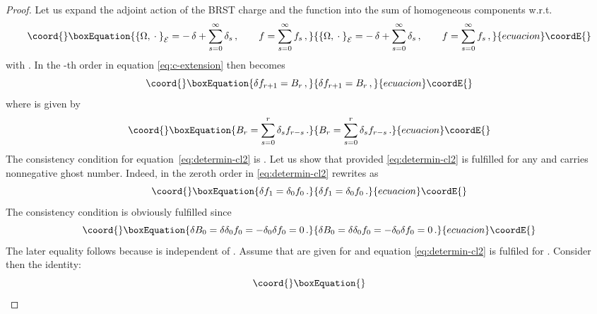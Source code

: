 \documentclass[a4paper,11pt]{amsart}
\numberwithin{thm}{section} %
\numberwithin{equation}{section} %
\numberwithin{figure}{section} %
\providecommand{\pb}[2]{\left\{{}#1{},{}#2{}\right\}}
\renewcommand{\:}{{\rm\, :\,}}
\def\d{\partial}
\providecommand{\dl}[1]{\displaystyle\frac{{\d}}{\d #1}}
\def\cc{{\mathcal C}}
\def\E{{ \mathcal E}}
\begin{document}
\begin{proof}
Let us expand the adjoint action \myHighlight{$\pb{\Omega}{\cdot}_\E$}\coordHE{} of the BRST
charge and the function \coordHE{} into the sum of homogeneous components
w.r.t. \coordHE{}
\begin{equation}\coord{}\boxEquation{
\pb{\Omega}{\cdot}_\E=-\,\delta+\sum_{s=0}^\infty \delta_s\,, \qquad
f=\sum_{s=0}^\infty f_s\,,
}{
\pb{\Omega}{\cdot}_\E=-\,\delta+\sum_{s=0}^\infty \delta_s\,, \qquad
f=\sum_{s=0}^\infty f_s\,,
}{ecuacion}\coordE{}\end{equation}
with \myHighlight{$\delta=\cc^A\dl{Y^A}$}\coordHE{}.  In the \coordHE{}-th order in \coordHE{}
equation \eqref{eq:c-extension} then becomes
\begin{equation}\coord{}\boxEquation{
\label{eq:determin-cl2}
\delta f_{r+1}=B_r\,,
}{
\delta f_{r+1}=B_r\,,
}{ecuacion}\coordE{}\end{equation}
where \coordHE{} is given by
\begin{equation}\coord{}\boxEquation{
  B_r=\sum_{s=0}^r \delta_s f_{r-s}\,.
}{
  B_r=\sum_{s=0}^r \delta_s f_{r-s}\,.
}{ecuacion}\coordE{}\end{equation}
The consistency condition for equation~\eqref{eq:determin-cl2} is
\coordHE{}.  Let us show that \coordHE{} provided
\eqref{eq:determin-cl2} is fulfilled for any \coordHE{} and \coordHE{}
carries nonnegative ghost number.  Indeed, in the zeroth order in \coordHE{}
\eqref{eq:determin-cl2} rewrites as
\begin{equation}\coord{}\boxEquation{
  \delta f_1=\delta_0 f_0\,.
}{
  \delta f_1=\delta_0 f_0\,.
}{ecuacion}\coordE{}\end{equation}
The consistency condition is obviously fulfilled since
\begin{equation}\coord{}\boxEquation{
  \delta B_0=\delta \delta_0 f_0=-\delta_0 \delta f_0=0\,.
}{
  \delta B_0=\delta \delta_0 f_0=-\delta_0 \delta f_0=0\,.
}{ecuacion}\coordE{}\end{equation}
The later equality follows because \coordHE{} is independent of \coordHE{}.
Assume that \coordHE{} are given for \coordHE{} and
equation \eqref{eq:determin-cl2} is fulfiled for \coordHE{}.
Consider then the identity:
\begin{equation}\coord{}\boxEquation{
}
\end{equation}
\end{proof}
\end{document}
